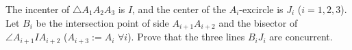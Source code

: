 The incenter of $\triangle A_1A_2A_3$ is $I$, and the center of the $A_i$-excircle is $J_i$ ($i=1,2,3$). Let $B_i$ be the intersection point of side $A_{i+1}A_{i+2}$ and the bisector of $\angle A_{i+1}IA_{i+2}$ ($A_{i+3}:=A_i$ $\forall i$). Prove that the three lines $B_iJ_i$ are concurrent.